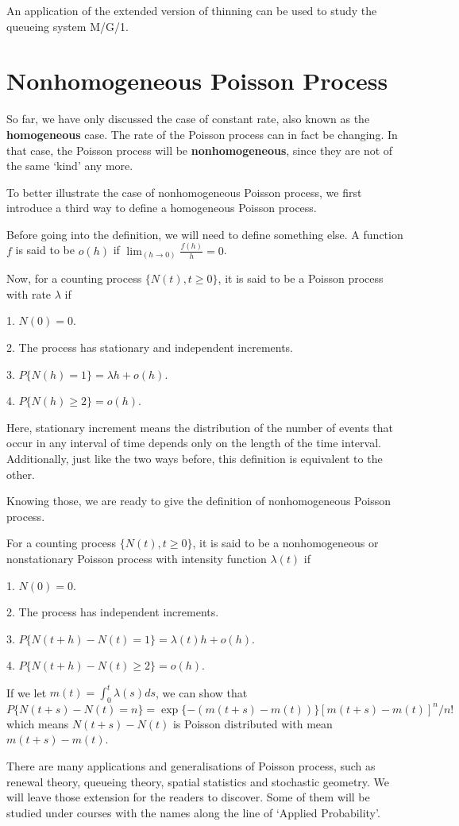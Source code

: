 \documentclass[11pt, a4paper, oneside]{book}
\theoremstyle{definition}
\def\cprocess{\{N(t), t\ge 0\}}
\begin{document}
\noindent An application of the extended version of thinning can be used to study the queueing system M/G/1. 

\section{Nonhomogeneous Poisson Process}

\noindent So far, we have only discussed the case of constant rate, also known as the \textbf{homogeneous} case. The rate of the Poisson process can in fact be changing. In that case, the Poisson process will be \textbf{nonhomogeneous}, since they are not of the same `kind' any more. 

\noindent To better illustrate the case of nonhomogeneous Poisson process, we first introduce a third way to define a homogeneous Poisson process. 

\noindent Before going into the definition, we will need to define something else. A function $f$ is said to be $o(h)$ if $\lim_(h \to 0) \frac{f(h)}{h} = 0$. 

\noindent Now, for a counting process $\cprocess$, it is said to be a Poisson process with rate $\lambda$ if

1. $N(0) = 0$.

2. The process has stationary and independent increments.

3. $P\{N(h) = 1\} = \lambda h + o(h)$.

4. $P\{N(h) \ge 2\} = o(h)$.

\noindent Here, stationary increment means the distribution of the number of events that occur in any interval of time depends only on the length of the time interval. Additionally, just like the two ways before, this definition is equivalent to the other. 

\noindent Knowing those, we are ready to give the definition of nonhomogeneous Poisson process. 

\noindent For a counting process $\cprocess$, it is said to be a nonhomogeneous or nonstationary Poisson process with intensity function $\lambda(t)$ if

1. $N(0) = 0$.

2. The process has independent increments.

3. $P\{N(t+h) - N(t) = 1\} = \lambda(t) h + o(h)$.

4. $P\{N(t+h) - N(t) \ge 2\} = o(h)$.

\noindent If we let $m(t) = \int_0^t \lambda(s) ds$, we can show that \[
P\{ N(t+s) - N(t) = n\} = \exp\{ -(m(t+s)-m(t))\} [m(t+s)-m(t)]^n / n!
\]
which means $N(t+s) - N(t)$ is Poisson distributed with mean $m(t+s) - m(t)$. 

\noindent There are many applications and generalisations of Poisson process, such as renewal theory, queueing theory, spatial statistics and stochastic geometry. We will leave those extension for the readers to discover. Some of them will be studied under courses with the names along the line of `Applied Probability'. 


\backmatter
\end{document}
